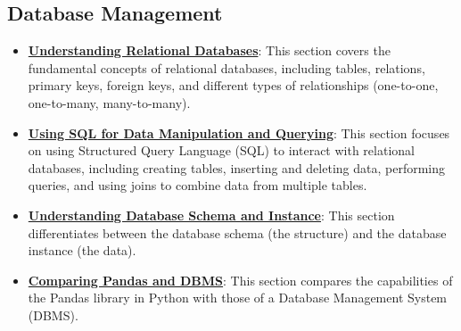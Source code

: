 \documentclass{article}%
\begin{document}
\subsection{Database Management}%
\label{subsec:DatabaseManagement}%
\begin{itemize}[leftmargin=*]%
\item \href{https://purdue.brightspace.com/d2l/common/assets/pdfjs-d2l-dist/1.0.14-legacy/web/viewer.html?file=\%2Fcontent\%2Fenforced\%2F1095465-WL.202510.CS24200.LE1\%2F23L2-relationaldb-sql.pdf\%3Fou\%3D1095465\&lang=en-us\&container=d2l-fileviewer-rendered-pdf\&fullscreen=d2l-fileviewer-rendered-pdf-dialog\&height=667#page=2}{\textbf{Understanding Relational Databases}}: This section covers the fundamental concepts of relational databases, including tables, relations, primary keys, foreign keys, and different types of relationships (one-to-one, one-to-many, many-to-many).%
\item \href{https://purdue.brightspace.com/d2l/common/assets/pdfjs-d2l-dist/1.0.14-legacy/web/viewer.html?file=\%2Fcontent\%2Fenforced\%2F1095465-WL.202510.CS24200.LE1\%2F23L2-relationaldb-sql.pdf\%3Fou\%3D1095465\&lang=en-us\&container=d2l-fileviewer-rendered-pdf\&fullscreen=d2l-fileviewer-rendered-pdf-dialog\&height=667#page=15}{\textbf{Using SQL for Data Manipulation and Querying}}: This section focuses on using Structured Query Language (SQL) to interact with relational databases, including creating tables, inserting and deleting data, performing queries, and using joins to combine data from multiple tables.%
\item \href{https://purdue.brightspace.com/d2l/common/assets/pdfjs-d2l-dist/1.0.14-legacy/web/viewer.html?file=\%2Fcontent\%2Fenforced\%2F1095465-WL.202510.CS24200.LE1\%2F23L2-relationaldb-sql.pdf\%3Fou\%3D1095465\&lang=en-us\&container=d2l-fileviewer-rendered-pdf\&fullscreen=d2l-fileviewer-rendered-pdf-dialog\&height=667#page=14}{\textbf{Understanding Database Schema and Instance}}: This section differentiates between the database schema (the structure) and the database instance (the data).%
\item \href{https://purdue.brightspace.com/d2l/common/assets/pdfjs-d2l-dist/1.0.14-legacy/web/viewer.html?file=\%2Fcontent\%2Fenforced\%2F1095465-WL.202510.CS24200.LE1\%2F23L2-relationaldb-sql.pdf\%3Fou\%3D1095465\&lang=en-us\&container=d2l-fileviewer-rendered-pdf\&fullscreen=d2l-fileviewer-rendered-pdf-dialog\&height=667#page=17}{\textbf{Comparing Pandas and DBMS}}: This section compares the capabilities of the Pandas library in Python with those of a Database Management System (DBMS).%

\end{itemize}
\end{document}
